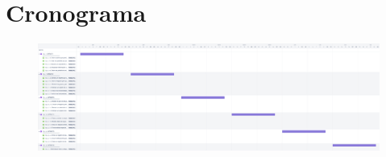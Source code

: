 \documentclass{article}
\begin{document}
\section{Cronograma}
\begin{figure}[h]
	\centering
	\includegraphics[scale=0.075]{Cronograma_Virtual_Baby.png}
\end{figure}
\end{document}
